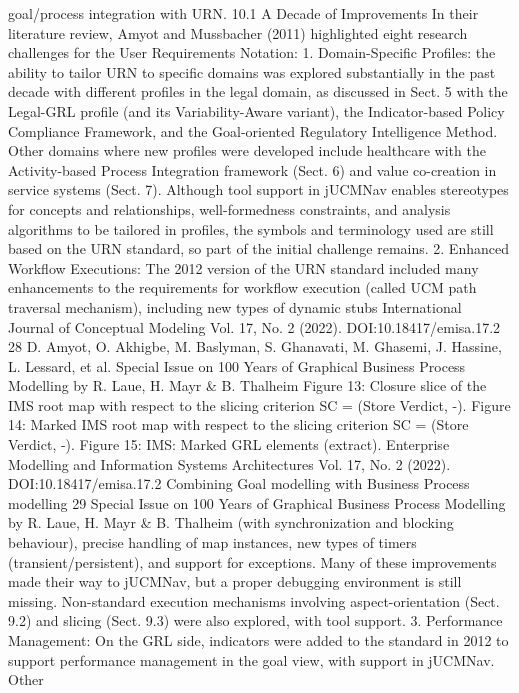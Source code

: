 goal/process integration with URN.
10.1 A Decade of Improvements
In their literature review, Amyot and Mussbacher
(2011) highlighted eight research challenges for
the User Requirements Notation:
1. Domain-Specific Profiles: the ability to tailor
URN to specific domains was explored substantially in the past decade with different profiles in
the legal domain, as discussed in Sect. 5 with the
Legal-GRL profile (and its Variability-Aware
variant), the Indicator-based Policy Compliance
Framework, and the Goal-oriented Regulatory
Intelligence Method. Other domains where new
profiles were developed include healthcare with
the Activity-based Process Integration framework (Sect. 6) and value co-creation in service
systems (Sect. 7). Although tool support in
jUCMNav enables stereotypes for concepts and
relationships, well-formedness constraints, and
analysis algorithms to be tailored in profiles, the
symbols and terminology used are still based
on the URN standard, so part of the initial
challenge remains.
2. Enhanced Workflow Executions: The 2012
version of the URN standard included many
enhancements to the requirements for workflow
execution (called UCM path traversal mechanism), including new types of dynamic stubs
International Journal of Conceptual Modeling
Vol. 17, No. 2 (2022). DOI:10.18417/emisa.17.2
28 D. Amyot, O. Akhigbe, M. Baslyman, S. Ghanavati, M. Ghasemi, J. Hassine, L. Lessard, et al.
Special Issue on 100 Years of Graphical Business Process Modelling by R. Laue, H. Mayr & B. Thalheim
Figure 13: Closure slice of the IMS root map with respect to the slicing criterion SC = (Store Verdict, -).
Figure 14: Marked IMS root map with respect to the slicing criterion SC = (Store Verdict, -).
Figure 15: IMS: Marked GRL elements (extract).
Enterprise Modelling and Information Systems Architectures
Vol. 17, No. 2 (2022). DOI:10.18417/emisa.17.2
Combining Goal modelling with Business Process modelling 29
Special Issue on 100 Years of Graphical Business Process Modelling by R. Laue, H. Mayr & B. Thalheim
(with synchronization and blocking behaviour),
precise handling of map instances, new types
of timers (transient/persistent), and support for
exceptions. Many of these improvements made
their way to jUCMNav, but a proper debugging
environment is still missing. Non-standard execution mechanisms involving aspect-orientation
(Sect. 9.2) and slicing (Sect. 9.3) were also explored, with tool support.
3. Performance Management: On the GRL side,
indicators were added to the standard in 2012
to support performance management in the
goal view, with support in jUCMNav. Other
